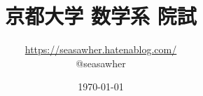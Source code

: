 \documentclass[12pt]{jsarticle}%
\begin{document}
\title{京都大学 数学系 院試}
\author{\url{https://seasawher.hatenablog.com/} \\ @seasawher}
\date{\today}
\maketitle



\newpage



\newpage


\end{document}
